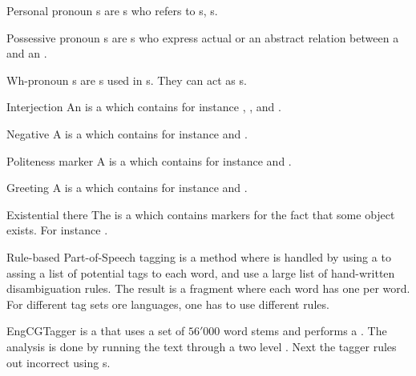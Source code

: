 \begin{df}{Personal pronoun}
\sb{}s are s who refers to s, s.
\end{df}
\begin{df}{Possessive pronoun}
\sb{}s are s who express actual  or an abstract relation between a  and an .
\end{df}
\begin{df}{Wh-pronoun}
\sb{}s are s used in s. They can act as s.
\end{df}
\begin{df}{Interjection}
An \sb{} is a  which contains for instance , ,  and .
\end{df}
\begin{df}{Negative}
A \sb{} is a  which contains for instance  and .
\end{df}
\begin{df}{Politeness marker}
A \sb{} is a  which contains for instance  and .
\end{df}
\begin{df}{Greeting}
A \sb{} is a  which contains for instance  and .
\end{df}
\begin{df}{Existential there}
The \sb{} is a  which contains markers for the fact that some object exists. For instance .
\end{df}
\begin{df}{Rule-based Part-of-Speech tagging}
\sb{} is a method where  is handled by using a  to assing a list of potential tags to each word, and use a large list of hand-written disambiguation rules. The result is a fragment where each word has one  per word. For different tag sets ore languages, one has to use different rules.
\end{df}
\begin{df}[Voutilainen]{EngCGTagger}
\sb{} is a  that uses a set of $56'000$ word stems and performs a . The analysis is done by running the text through a two level . Next the tagger rules out incorrect  using s.
\end{df}
